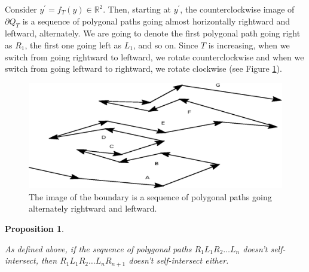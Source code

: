\documentclass{article}
\theoremstyle{theorem}
\newtheorem{prop}[teorema]{Proposition}
\newcommand{\field}[1]{\ensuremath{\mathbb{#1}}}
\newcommand{\R}{\field{R}}
\begin{document}
Consider $y^{\prime} = f_T(y) \in \R ^2$. Then, starting at $y^{\prime}$, the counterclockwise image of $\partial Q_T$ is a sequence of polygonal paths going almost horizontally rightward and leftward, alternately. We are going to denote the first polygonal path going right as $R_1$, the first one going left as $L_1$, and so on. Since $T$ is increasing, when we switch from going rightward to leftward, we rotate counterclockwise and when we switch from going leftward to rightward, we rotate clockwise (see Figure \ref{Cro}). 



\begin{figure}[h]
\centering
{}
\includegraphics[scale=0.65]{Bry2.eps}
\caption{The image of the boundary is a sequence of polygonal paths going alternately rightward and leftward.}\label{Cro}
\end{figure}




\begin{prop}\label{Zig}
{As defined above, if the sequence of polygonal paths $R_1L_1R_2\ldots L_n$ doesn't self-intersect, then $R_1L_1 R_2 \ldots L_nR_{n+1}$ doesn't self-intersect either.  

}
\end{prop}
\end{document}
